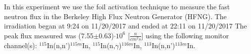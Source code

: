 In this experiment we use the foil activation technique to measure the fast neutron flux in the Berkeley High Flux Neutron Generator (HFNG).  The irradiation began at 9:24 on 11/20/2017 and ended at 22:11 on 11/20/2017  The peak flux measured was (7.55$\pm$0.63)$\cdot 10^6$ [$\frac{n}{cm^2s}$] using the following monitor channel(s): $^{115}$In(n,n')$^{115m}$In, $^{115}$In(n,$\gamma$)$^{116m}$In, $^{113}$In(n,n')$^{113m}$In.